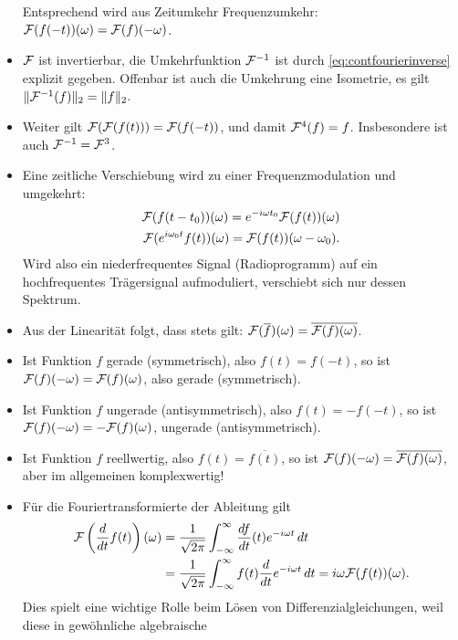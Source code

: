 \begin{itemize}
  Entsprechend wird aus Zeitumkehr Frequenzumkehr: $\mathcal F(f(-t))(\omega)
  = \mathcal F(f)(-\omega)$.
\item $\mathcal F$ ist invertierbar, die Umkehrfunktion $\mathcal F^{-1}$ ist durch
  \eqref{eq:contfourierinverse} explizit gegeben. Offenbar ist auch
  die Umkehrung eine Isometrie, es gilt $\lVert \mathcal F^{-1}(f)
  \rVert_2 =\lVert f \rVert_2$.
\item Weiter gilt $\mathcal F(\mathcal F(f(t))) = \mathcal F(f(-t))$, und damit $\mathcal F^4(f) =
  f$. Insbesondere ist auch $\mathcal F^{-1} = \mathcal F^3$.
\item Eine zeitliche Verschiebung wird zu einer Frequenzmodulation und
  umgekehrt:
  \begin{eqnarray}
    \label{eq:fouriertimeshift}
    \mathcal F(f(t-t_0))(\omega) = e^{-i\omega t_0} \mathcal F(f(t))(\omega)\\
    \label{eq:fourierfreqshift}
    \mathcal F(e^{i\omega_0 t}f(t))(\omega) = \mathcal F(f(t))(\omega-\omega_0).
  \end{eqnarray}
  Wird also ein niederfrequentes Signal (Radioprogramm) auf ein
  hochfrequentes Trägersignal aufmoduliert, verschiebt sich nur dessen
  Spektrum. 
\item Aus der Linearität folgt, dass stets gilt:
  $\mathcal F(\overline{f})(\omega) = \overline{\mathcal F(f)(\omega)}$.
\item Ist Funktion $f$ gerade (symmetrisch), also $f(t) = f(-t)$, so ist
  $\mathcal F(f)(-\omega) = \mathcal F(f)(\omega)$, also gerade (symmetrisch).
\item Ist Funktion $f$ ungerade (antisymmetrisch), also $f(t) = -f(-t)$, so ist
  $\mathcal F(f)(-\omega) = -\mathcal F(f)(\omega)$, ungerade (antisymmetrisch).
\item Ist Funktion $f$ reellwertig, also $f(t) = \overline{f(t)}$, so
  ist $\mathcal F(f)(-\omega) = \overline{\mathcal F(f)(\omega)}$, aber im
  allgemeinen komplexwertig!
\item Für die Fouriertransformierte der Ableitung gilt
  \begin{equation}
    \begin{split}
      \mathcal F\left(\frac{d}{dt}f(t)\right)(\omega) &=
      \frac{1}{\sqrt{2\pi}}\int_{-\infty}^{\infty}
      \frac{df}{dt}(t)e^{-i
        \omega t}\, dt\\
      &= \frac{1}{\sqrt{2\pi}}\int_{-\infty}^{\infty}
      f(t)\frac{d}{dt}e^{-i \omega t}\, dt = i\omega
      \mathcal F(f(t))(\omega).
    \end{split}
  \end{equation}
  Dies spielt eine wichtige Rolle beim Lösen von
  Differenzialgleichungen, weil diese in gewöhnliche algebraische

\end{itemize}
